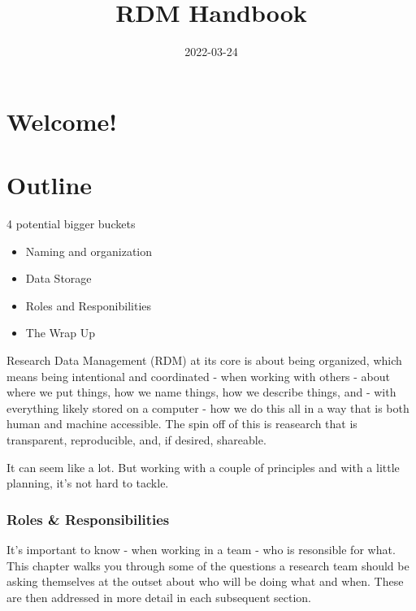 \documentclass[
]{book}
\title{RDM Handbook}
\author{}
\date{\vspace{-2.5em}2022-03-24}
\providecommand{\tightlist}{%
  \setlength{\itemsep}{0pt}\setlength{\parskip}{0pt}}
\begin{document}
\maketitle

{
\setcounter{tocdepth}{1}
\tableofcontents
}
\hypertarget{welcome}{%
\chapter*{Welcome!}\label{welcome}}

\hypertarget{outline}{%
\chapter*{Outline}\label{outline}}

4 potential bigger buckets

\begin{itemize}
\tightlist
\item
  Naming and organization
\item
  Data Storage
\item
  Roles and Responibilities
\item
  The Wrap Up
\end{itemize}

Research Data Management (RDM) at its core is about being organized, which means being intentional and coordinated - when working with others - about where we put things, how we name things, how we describe things, and - with everything likely stored on a computer - how we do this all in a way that is both human and machine accessible. The spin off of this is reasearch that is transparent, reproducible, and, if desired, shareable.

It can seem like a lot. But working with a couple of principles and with a little planning, it's not hard to tackle.

\hypertarget{roles-responsibilities}{%
\subsection*{Roles \& Responsibilities}\label{roles-responsibilities}}

It's important to know - when working in a team - who is resonsible for what. This chapter walks you through some of the questions a research team should be asking themselves at the outset about who will be doing what and when. These are then addressed in more detail in each subsequent section.
\end{document}

